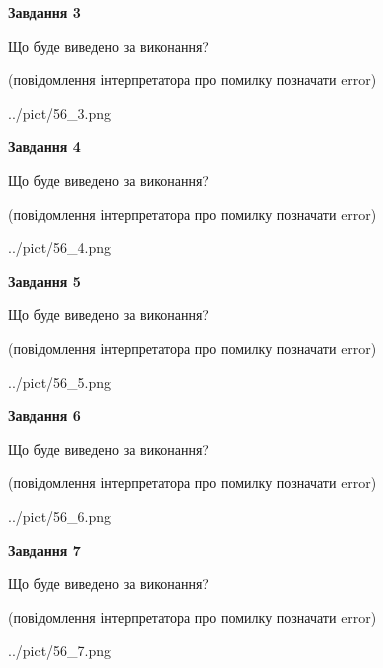 \documentclass[12pt, ukrainian]{article}
\begin{document}
{\begin {large}
{\begin {center}\textbf{Завдання 3}\end {center}}\par
Що буде виведено за виконання?\par
 (повідомлення інтерпретатора про помилку позначати error)\par
\begin{center}
	{../pict/56_3.png}
\end{center}
\newpage

{\begin {center}\textbf{Завдання 4}\end {center}}\par
Що буде виведено за виконання?\par
 (повідомлення інтерпретатора про помилку позначати error)\par
\begin{center}
	{../pict/56_4.png}
\end{center}
\newpage

{\begin {center}\textbf{Завдання 5}\end {center}}\par
Що буде виведено за виконання?\par
 (повідомлення інтерпретатора про помилку позначати error)\par
\begin{center}
	{../pict/56_5.png}
\end{center}
\newpage

{\begin {center}\textbf{Завдання 6}\end {center}}\par
Що буде виведено за виконання?\par
 (повідомлення інтерпретатора про помилку позначати error)\par
\begin{center}
	{../pict/56_6.png}
\end{center}
\newpage

{\begin {center}\textbf{Завдання 7}\end {center}}\par
Що буде виведено за виконання?\par
 (повідомлення інтерпретатора про помилку позначати error)\par
\begin{center}
	{../pict/56_7.png}
\end{center}
\newpage


\end{large}}
\end{document}
